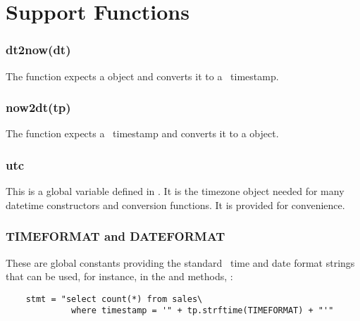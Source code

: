 \section{Support Functions}\label{sec_supp}
\subsubsection{dt2now(dt)}
The function expects a 
object and converts it to a \nowdb\ timestamp.

\subsubsection{now2dt(tp)}
The function expects a \nowdb\ timestamp
and converts it to a  object.

\subsubsection{utc}
This is a global variable defined in .
It is the  timezone object needed
for many datetime constructors and conversion functions.
It is provided for convenience.

\subsubsection{TIMEFORMAT and DATEFORMAT}
These are global constants providing the
standard \nowdb\ time and date format
strings that can be used, for instance,
in the 
 and  methods, \eg:

\begin{python}
\begin{lstlisting}
    stmt = "select count(*) from sales\
             where timestamp = '" + tp.strftime(TIMEFORMAT) + "'"
\end{lstlisting}
\end{python}
